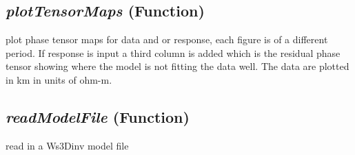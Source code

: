 \subsection{\textit{plotTensorMaps} (Function)}
\label{ssec:modeling.ws3dtools.plotTensorMaps}

plot phase tensor maps for data and or response, each figure is of a
    different period.  If response is input a third column is added which is 
    the residual phase tensor showing where the model is not fitting the data 
    well.  The data are plotted in km in units of ohm-m.

\subsection{\textit{readModelFile} (Function)}
\label{ssec:modeling.ws3dtools.readModelFile}

read in a Ws3Dinv model file


